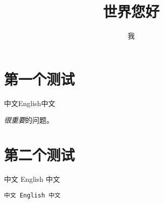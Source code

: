 \documentclass{ctexart}
\begin{document}
\title{世界您好}
\author{我}
\maketitle

\tableofcontents

\section{第一个测试}
中文English中文

\emph{很重要}的问题。

\section{第二个测试}
中文 English 中文


\verb|中文 English 中文|
\end{document}
